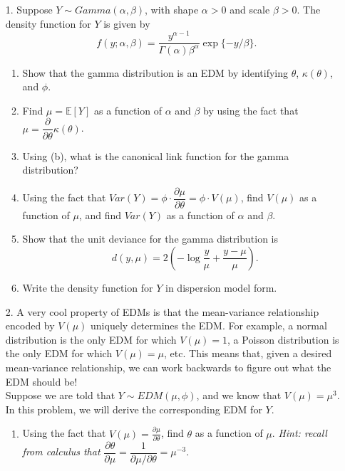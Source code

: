 \documentclass[11pt]{article}
\begin{document}
\begin{enumerate}
\item[1.] Suppose $Y \sim Gamma(\alpha, \beta)$, with shape $\alpha > 0$ and scale $\beta > 0$. The density function for $Y$ is given by
$$f(y; \alpha, \beta) = \dfrac{y^{\alpha - 1}}{\Gamma(\alpha) \beta^\alpha} \exp \{ -y/\beta\}.$$

\begin{enumerate}
\item Show that the gamma distribution is an EDM by identifying $\theta$, $\kappa(\theta)$, and $\phi$.

\item Find $\mu = \mathbb{E}[Y]$ as a function of $\alpha$ and $\beta$ by using the fact that $\mu = \dfrac{\partial}{\partial \theta} \kappa(\theta)$.

\item Using (b), what is the canonical link function for the gamma distribution?

\item Using the fact that $Var(Y) = \phi \cdot \dfrac{\partial \mu}{\partial \theta} = \phi \cdot V(\mu)$, find $V(\mu)$ as a function of $\mu$, and find $Var(Y)$ as a function of $\alpha$ and $\beta$.

\item Show that the unit deviance for the gamma distribution is
$$d(y, \mu) = 2 \left( - \log \frac{y}{\mu} + \frac{y - \mu}{\mu} \right).$$

\item Write the density function for $Y$ in dispersion model form.
\end{enumerate}

\item[2.] A very cool property of EDMs is that the mean-variance relationship encoded by $V(\mu)$ uniquely determines the EDM. For example, a normal distribution is the only EDM for which $V(\mu) = 1$, a Poisson distribution is the only EDM for which $V(\mu) = \mu$, etc. This means that, given a desired mean-variance relationship, we can work backwards to figure out what the EDM should be!\\

Suppose we are told that $Y \sim EDM(\mu, \phi)$, and we know that $V(\mu) = \mu^3$. In this problem, we will derive the corresponding EDM for $Y$.

\begin{enumerate}
\item Using the fact that $V(\mu) = \frac{\partial \mu}{\partial \theta}$, find $\theta$ as a function of $\mu$. \textit{Hint: recall from calculus that} $\dfrac{\partial \theta}{\partial \mu} = \dfrac{1}{\partial \mu / \partial \theta} = \mu^{-3}$.


\end{enumerate}
\end{enumerate}
\end{document}
